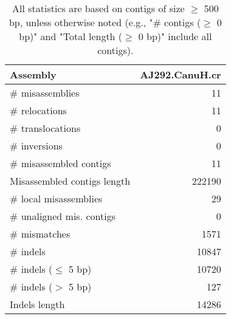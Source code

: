 \documentclass[12pt,a4paper]{article}
\begin{document}
\begin{table}[ht]
\begin{center}
\caption{All statistics are based on contigs of size $\geq$ 500 bp, unless otherwise noted (e.g., "\# contigs ($\geq$ 0 bp)" and "Total length ($\geq$ 0 bp)" include all contigs).}
\begin{tabular}{|l*{1}{|r}|}
\hline
Assembly & AJ292.CanuH.cr \\ \hline
\# misassemblies & 11 \\ \hline
\hspace{5mm}\# relocations & 11 \\ \hline
\hspace{5mm}\# translocations & 0 \\ \hline
\hspace{5mm}\# inversions & 0 \\ \hline
\# misassembled contigs & 11 \\ \hline
Misassembled contigs length & 222190 \\ \hline
\# local misassemblies & 29 \\ \hline
\# unaligned mis. contigs & 0 \\ \hline
\# mismatches & 1571 \\ \hline
\# indels & 10847 \\ \hline
\hspace{5mm}\# indels ($\leq$ 5 bp) & 10720 \\ \hline
\hspace{5mm}\# indels ($>$ 5 bp) & 127 \\ \hline
Indels length & 14286 \\ \hline
\end{tabular}
\end{center}
\end{table}
\end{document}
